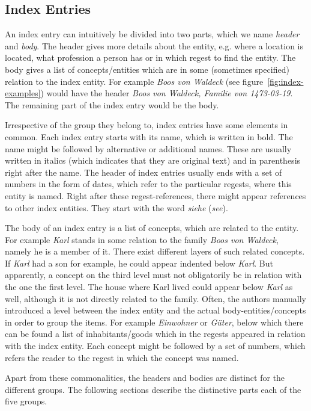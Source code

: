 \subsection{Index Entries}
An index entry can intuitively be divided into two parts, which we name \textit{header} and \textit{body}. The header gives more details about the entity, e.g. where a location is located, what profession a person has or in which regest to find the entity. The body gives a list of concepts/entities which are in some (sometimes specified) relation to the index entity. For example \textit{Boos von Waldeck} (see figure~\ref{fig:index-examples}) would have the header \textit{Boos von Waldeck, Familie von 1473-03-19}. The remaining part of the index entry would be the body.

Irrespective of the group they belong to, index entries have some elements in common. Each index entry starts with its name, which is written in bold. The name might be followed by alternative or additional names. These are usually written in italics (which indicates that they are original text) and in parenthesis right after the name. The header of index entries usually ends with a set of numbers in the form of dates, which refer to the particular regests, where this entity is named. Right after these regest-references, there might appear references to other index entities. They start with the word \textit{siehe} (\textit{see}).

The body of an index entry is a list of concepts, which are related to the entity. For example \textit{Karl} stands in some relation to the family \textit{Boos von Waldeck}, namely he is a member of it. There exist different layers of such related concepts. If \textit{Karl} had a son for example, he could appear indented below \textit{Karl}. But apparently, a concept on the third level must not obligatorily be in relation with the one the first level. The house where Karl lived could appear below \textit{Karl} as well, although it is not directly related to the family. Often, the authors manually introduced a level between the index entity and the actual body-entities/concepts in order to group the items. For example \textit{Einwohner} or \textit{Güter}, below which there can be found a list of inhabitants/goods which in the regests appeared in relation with the index entity. Each concept might be followed by a set of numbers, which refers the reader to the regest in which the concept was named.

Apart from these commonalities, the headers and bodies are distinct for the different groups. The following sections describe the distinctive parts each of the five groups. 

